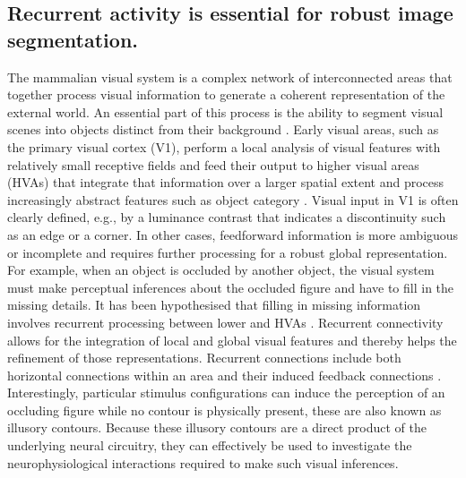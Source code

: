 \documentclass[12pt]{article}
\begin{document}



\subsection{Recurrent activity is essential for robust image segmentation.}

\setlength{\parindent}{12pt} The mammalian visual system is a complex network of interconnected areas that together process visual information to generate a coherent representation of the external world. An essential part of this process is the ability to segment visual scenes into objects distinct from their background \autocite{kirchbergerEssentialRoleFeedback2020}. Early visual areas, such as the primary visual cortex (V1), perform a local analysis of visual features with relatively small receptive fields and feed their output to higher visual areas (HVAs) that integrate that information over a larger spatial extent and process increasingly abstract features such as object category \autocite{ashbridgeEffectImageOrientation2000}. Visual input in V1 is often clearly defined, e.g., by a luminance contrast that indicates a discontinuity such as an edge or a corner. In other cases, feedforward information is more ambiguous or incomplete and requires further processing for a robust global representation. For example, when an object is occluded by another object, the visual system must make perceptual inferences about the occluded figure and have to fill in the missing details. It has been hypothesised that filling in missing information involves recurrent processing between lower and HVAs \autocite{wyatteEarlyRecurrentFeedback2014}. Recurrent connectivity allows for the integration of local and global visual features and thereby helps the refinement of those representations. Recurrent connections include both horizontal connections within an area and their induced feedback connections \autocite{roelfsemaCORTICALALGORITHMSPERCEPTUAL2006,shushruthStrongRecurrentNetworks2012}. Interestingly, particular stimulus configurations can induce the perception of an occluding figure while no contour is physically present, these are also known as illusory contours. Because these illusory contours are a direct product of the underlying neural circuitry, they can effectively be used to investigate the neurophysiological interactions required to make such visual inferences.
\setlength{\parindent}{0pt}
\end{document}
